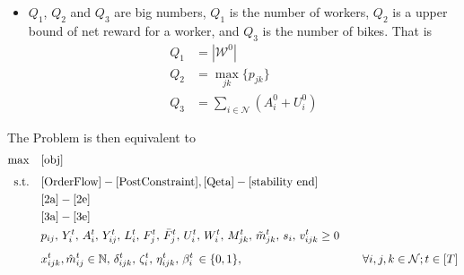 \documentclass[trsc,nonblindrev]{informs3noheader}
\begin{document}
\begin{itemize}
   We introduce a new variable $v_{ijk}^t$ to substitute the bilinear term $\delta_{ijk}^tM_{jk}^t$ and use similar method as above, \eqref{deltaM} is equivalent to the following constraints:
\begin{subequations}
    \begin{align}
         v_{ijk}^t&\leq \sum_{i':d_{i'j}\leq d_{ij}}x_{i'jk}^t &\forall i,j,k\in \mathcal{N}; t\in [T] \label{3a}\\
        v_{ijk}^t &\leq M_{jk}^t &\forall i,j,k\in \mathcal{N}; t\in [T] \\
        v_{ijk}^t &\leq Q_3 \cdot \delta_{ijk}^t &\forall i,j,k\in \mathcal{N}; t\in [T] \\
        v_{ijk}^t &\geq M_{jk}^t - Q_3 \cdot (1 - \delta_{ijk}^t) &\forall i,j,k\in \mathcal{N}; t\in [T] \\
        v_{ijk}^t &\geq 0 &\forall i,j,k\in \mathcal{N}; t\in [T]\label{3e}
    \end{align}
\end{subequations}
    \item $Q_1$, $Q_2$ and $Q_3$ are big numbers, $Q_1$ is the number of workers, $Q_2$ is a upper bound of net reward for a worker, and $Q_3$ is the number of bikes. That is
    \begin{align*}
        Q_1 & =|\mathcal{W}^0|\\
        Q_2 & = \max_{jk}\{p_{jk}\}\\
        Q_3 & =\sum_{i\in \mathcal{N}}(A^0_i+U^0_i)
    \end{align*}
\end{itemize}


The Problem is then equivalent to 
\begin{align*}
    \mathbf{\max} \quad
    &\eqref{obj}\\[4pt]
    \text{s.t.} \quad & \eqref{OrderFlow}-\eqref{PostConstraint}, \eqref{Qeta}-\eqref{stability end}\\
    & \eqref{2a}-\eqref{2e}\\
    & \eqref{3a}-\eqref{3e}\\
    & p_{ij},\,
    Y_i^t,\,
    A_i^t,\,
    Y_{ij}^t,\,
    L_i^t,\,
    F_j^t,\,
    \bar{F}_j^t,\,
    U_i^t,\,
    W_i^t,\,
    M_{jk}^t,\,
    \tilde{m}_{jk}^t,\,
    s_i,\,
    v_{ijk}^t
    \ge 0 & \nonumber\\[4pt]
    &x_{ijk}^t, \hat{m}_{ij}^t\in \mathbb{N},\,
    \delta_{ijk}^t,\,
    \zeta_i^t,\,
    \eta_{ijk}^t,\,
    \beta_i^t\,
    \in \{0,1\}, \,
    & \quad \forall i,j,k\in \mathcal{N}; t\in [T]
\end{align*}
\end{document}
